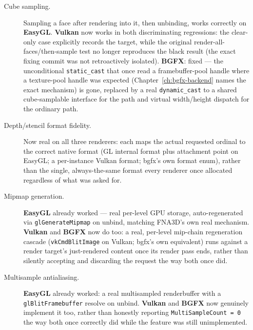 \begin{description}
  \item[Cube sampling.] Sampling a  face after rendering into it,
        then unbinding, works correctly on \textbf{EasyGL}. \textbf{Vulkan} now works in both
        discriminating
        regressions: the clear-only case explicitly records the target, while the original
        render-all-faces/then-sample test no longer reproduces the black
        result (the exact fixing commit was not retroactively isolated).
        \textbf{BGFX}: fixed --- the unconditional \texttt{static\_cast} that once read a
        framebuffer-pool handle where a texture-pool handle was expected
        (Chapter~\ref{ch:bgfx-backend} names the exact mechanism) is gone, replaced by a real
        \texttt{dynamic\_cast} to a shared cube-samplable interface for the
         path and virtual width/height dispatch for the ordinary
         path.
  \item[Depth/stencil format fidelity.] Now real on all three renderers: each maps the actual
        requested  ordinal to the correct native format (GL internal
        format plus attachment point on EasyGL; a per-instance Vulkan format; bgfx's own
        format enum), rather than the single, always-the-same format every renderer once
        allocated regardless of what was asked for.
  \item[Mipmap generation.] \textbf{EasyGL} already worked --- real per-level GPU storage,
        auto-regenerated via \texttt{glGenerateMipmap} on unbind, matching FNA3D's own real
        mechanism. \textbf{Vulkan} and \textbf{BGFX} now do too: a real, per-level mip-chain
        regeneration cascade (\texttt{vkCmdBlitImage} on Vulkan; bgfx's own equivalent) runs
        against a render target's just-rendered content once its render pass ends, rather than
        silently accepting and discarding the request the way both once did.
  \item[Multisample antialiasing.] \textbf{EasyGL} already worked: a real multisampled
        renderbuffer with a \texttt{glBlitFramebuffer} resolve on unbind. \textbf{Vulkan} and
        \textbf{BGFX} now genuinely implement it too, rather than honestly reporting
        \texttt{MultiSampleCount = 0} the way both once correctly did while the feature was
        still unimplemented.
\end{description}

